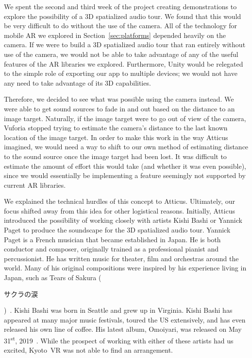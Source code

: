 \documentclass[a4paper, 10pt, american, titlepage]{article}
\begin{document}
We spent the second and third week of the project creating demonstrations to
explore the possibility of a 3D spatialized audio tour. We found that this would
be very difficult to do without the use of the camera. All of the technology for
mobile AR we explored in Section~\ref{sec:platforms} depended heavily on the
camera. If we were to build a 3D spatialized audio tour that ran entirely
without use of the camera, we would not be able to take advantage of any of the
useful features of the AR libraries we explored. Furthermore, Unity would be
relegated to the simple role of exporting our app to multiple devices; we would
not have any need to take advantage of its 3D capabilities.

Therefore, we decided to see what was possible using the camera instead. We were
able to get sound sources to fade in and out based on the distance to an image
target. Naturally, if the image target were to go out of view of the camera,
Vuforia stopped trying to estimate the camera's distance to the last known
location of the image target. In order to make this work in the way Atticus
imagined, we would need a way to shift to our own method of estimating distance
to the sound source once the image target had been lost. It was difficult to
estimate the amount of effort this would take (and whether it was even
possible), since we would essentially be implementing a feature seemingly not
supported by current AR libraries.

We explained the technical hurdles of this concept to Atticus. Ultimately, our
focus shifted away from this idea for other logistical reasons. Initially,
Atticus introduced the possibility of working closely with artists Kishi Bashi
or Yannick Paget to produce the soundscape for the 3D spatialized audio tour.
Yannick Paget is a French musician that became established in Japan. He is both
conductor and composer, originally trained as a professional pianist and
percussionist. He has written music for theater, film and orchestras around the
world. Many of his original compositions were inspired by his experience living
in Japan, such as Tears of Sakura
(\begin{CJK}{UTF8}{min}サクラの涙\end{CJK})~\autocite{yannickpaget2016}. Kishi
Bashi was born in Seattle and grew up in Virginia. Kishi Bashi has appeared at
many major music festivals, toured the US extensively, and has even released his
own line of coffee. His latest album, Omoiyari, was released on May
31\textsuperscript{st}, 2019~\autocite{kishibashi2019}. While the prospect of
working with either of these artists had us excited, Kyoto~VR was not able to
find an arrangement.
\end{document}
